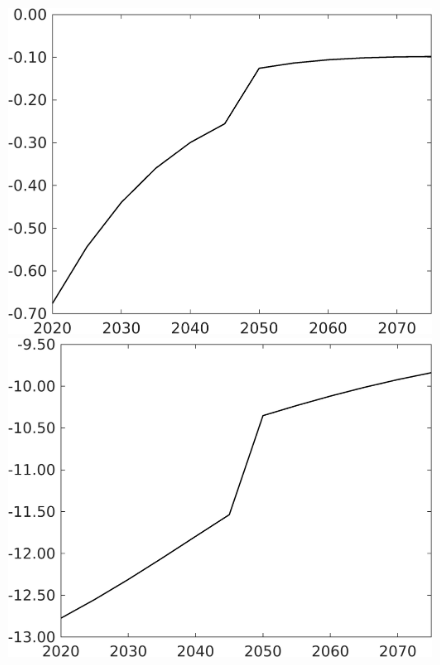 \documentclass[12pt]{article}
\begin{document}
\begin{figure}[h!!]
\begin{minipage}[]{0.32\textwidth}
	\end{minipage}	
	\begin{minipage}[]{0.32\textwidth}
		\includegraphics[width=1\textwidth]{../../codding_model/own_basedOnFried/optimalPol_010922_revision/figures/all_13Sept22/CompTaufPER_bytaul_Equlab_Reg0_Lf_spillover0_nsk0_xgr0_knspil1_sep0_LFlimit1_emsbase0_countec0_GovRev0_etaa0.79_lgd0.png}
	\end{minipage}		
	\begin{minipage}[]{0.32\textwidth}
		\includegraphics[width=1\textwidth]{../../codding_model/own_basedOnFried/optimalPol_010922_revision/figures/all_13Sept22/CompTaufPER_bytaul_Equlab_Reg0_Lg_spillover0_nsk0_xgr0_knspil1_sep0_LFlimit1_emsbase0_countec0_GovRev0_etaa0.79_lgd0.png}

\end{minipage}
\end{figure}
\end{document}
